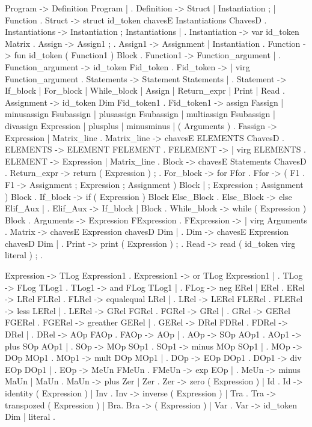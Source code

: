 Program -> Definition Program | .
Definition -> Struct | Instantiation ; | Function .
Struct -> struct id_token chavesE Instantiations ChavesD .
Instantiations -> Instantiation ; Instantiations | .
Instantiation -> var id_token Matrix .
Assign -> Assign1 ; .
Assign1 -> Assignment | Instantiation .
Function -> fun id_token ( Function1 ) Block .
Function1 -> Function_argument | .
Function_argument -> id_token Fid_token .
Fid_token -> | virg Function_argument .
Statements -> Statement Statements | .
Statement -> If_block | For_block | While_block | Assign | Return_expr | Print | Read .
Assignment -> id_token Dim Fid_token1 .
Fid_token1 -> assign Fassign | minusassign Fsubassign | plusassign Fsubassign | multiassign Fsubassign | divassign Expression | plusplus | minusminus | ( Arguments ) .
Fassign -> Expression | Matrix_line .
Matrix_line -> chavesE ELEMENTS ChavesD .
ELEMENTS -> ELEMENT FELEMENT .
FELEMENT -> | virg ELEMENTS .
ELEMENT -> Expression | Matrix_line .
Block -> chavesE Statements ChavesD .
Return_expr -> return ( Expression ) ; .
For_block -> for Ffor .
Ffor -> ( F1 .
F1 -> Assignment ; Expression ; Assignment ) Block | ; Expression ; Assignment ) Block .
If_block -> if ( Expression ) Block Else_Block .
Else_Block -> else Elif_Aux | .
Elif_Aux -> If_block | Block .
While_block -> while ( Expression ) Block .
Arguments -> Expression FExpression .
FExpression -> | virg Arguments .
Matrix -> chavesE Expression chavesD Dim | .
Dim -> chavesE Expression chavesD Dim | .
Print -> print ( Expression ) ; .
Read -> read ( id_token virg literal ) ; .



Expression -> TLog Expression1 .
Expression1 -> or TLog Expression1 | .
TLog -> FLog TLog1 .
TLog1 -> and FLog TLog1 | .
FLog -> neg ERel | ERel .
ERel -> LRel FLRel .
FLRel -> equalequal LRel | .
LRel -> LERel FLERel .
FLERel -> less LERel | .
LERel -> GRel FGRel .
FGRel -> \leq GRel | .
GRel -> GERel FGERel .
FGERel -> greather GERel | .
GERel -> DRel FDRel .
FDRel -> \geq DRel | .
DRel -> AOp FAOp .
FAOp -> \neq AOp | .
AOp -> SOp AOp1 .
AOp1 -> plus SOp AOp1 | .
SOp -> MOp SOp1 .
SOp1 -> minus MOp SOp1 | .
MOp -> DOp MOp1 .
MOp1 -> mult DOp MOp1 | .
DOp -> EOp DOp1 .
DOp1 -> div EOp DOp1 | .
EOp -> MeUn FMeUn .
FMeUn -> exp EOp | .
MeUn -> minus MaUn | MaUn .
MaUn -> plus Zer | Zer .
Zer -> zero ( Expression ) | Id .
Id -> identity ( Expression ) | Inv .
Inv -> inverse ( Expression ) | Tra .
Tra -> transpozed ( Expression ) | Bra.
Bra -> ( Expression ) | Var .
Var -> id_token Dim | literal .
